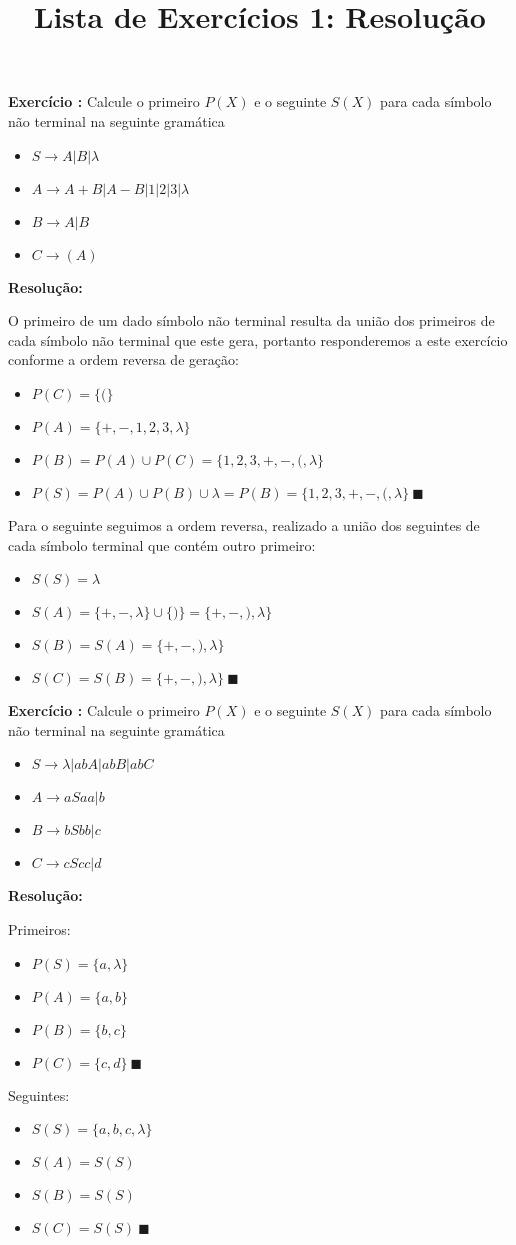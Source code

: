\documentclass[a4paper]{article}
\title{Lista de Exercícios 1: Resolução}
\author{
    \addauthor{Guilherme de Abreu}{12543033} 
    \addauthor{Hélio Cardoso}{10310227} 
    \addauthor{Laura Cardoso}{13692334}
    \addauthor{Sandy Dutra}{12544570}
    \addauthor{Theo dos Santos}{10691331}
}
\newcounter{count}
\newcommand{\exercise}[2]{%
  \stepcounter{count}%
  \noindent\textbf{Exercício \thecount:} Calcule o primeiro $P(X)$ e o seguinte $S(X)$ para cada símbolo não terminal na seguinte gramática
%
  \vspace{\baselineskip}%
  \begin{itemize}
    #1
  \end{itemize}
  \vspace{\baselineskip}%
  \noindent\textbf{Resolução:}%
  \vspace{\baselineskip}%
  
  #2 
  \vspace{2\baselineskip}%
}
\begin{document}
\maketitle

\exercise {
	\item $S \rightarrow A | B | \lambda$
	\item $A \rightarrow A + B | A - B | 1 | 2 | 3 | \lambda$
	\item $B \rightarrow A | B$
	\item $C \rightarrow (A)$
} {
	O primeiro de um dado símbolo não terminal resulta da união dos primeiros de cada símbolo não terminal que este gera, portanto responderemos a este exercício conforme a ordem reversa de geração:

	\begin{itemize}
		\item $P(C) = \{(\}$
		\item $P(A) = \{+, -, 1, 2, 3, \lambda \}$
		\item $P(B) = P(A) \cup P(C) = \{ 1, 2, 3, +, -, (, \lambda \}$
		\item $P(S) = P(A) \cup P(B) \cup \lambda = P(B) = \{ 1, 2, 3, +, -, (, \lambda \}\ \blacksquare$
	\end{itemize}

	Para o seguinte seguimos a ordem reversa, realizado a união dos seguintes de cada símbolo terminal que contém outro primeiro:

	\begin{itemize}
		\item $S(S) = {\lambda}$
		\item $S(A) = \{+, -, \lambda \} \cup \{)\} = \{+, -, ), \lambda\}$
		\item $S(B) = S(A) = \{+, -, ), \lambda\}$
		\item $S(C) = S(B) =  \{+, -, ), \lambda\}\ \blacksquare$
	\end{itemize}
}

\exercise {
	\item $S \rightarrow \lambda | abA | abB | abC$
	\item $A \rightarrow aSaa | b$
	\item $B \rightarrow bSbb | c$
	\item $C \rightarrow cScc | d$
} {
	Primeiros:
	\begin{itemize}
		\item $P(S) = \{a, \lambda\}$
		\item $P(A) = \{a, b\}$
		\item $P(B) = \{b, c\}$
		\item $P(C) = \{c, d\}\ \blacksquare$
	\end{itemize}

	Seguintes:
	\begin{itemize}
		\item $S(S) = \{a, b, c, \lambda\}$
		\item $S(A) = S(S)$
		\item $S(B) = S(S)$
		\item $S(C) = S(S)\ \blacksquare$
	\end{itemize}

}
\end{document}
